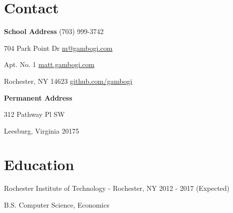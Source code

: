 \documentclass[letter,margin,line]{resume}
\newcommand{\rdate}[1]{\hfill {\small #1}}
\begin{document}
    \begin{resume}
        \section{\mysidestyle Contact} \vspace{2mm}
        \begin{asparablank}
        \item
        \item {\bf School Address}  \hfill (703) 999-3742
        \item 704 Park Point Dr     \hfill \href{mailto:m@gambogi.com}{m@gambogi.com}
        \item Apt. No. 1            \hfill \href{http://matt.gambogi.com}{matt.gambogi.com}
        \item Rochester, NY 14623   \hfill \href{https://github.com/gambogi}{github.com/gambogi}
        \\
        \item {\bf Permanent Address}
        \item 312 Pathway Pl SW
        \item Leesburg, Virginia 20175
        \end{asparablank}

        \section{\mysidestyle Education}
        \begin{compactdesc}
        \item[Rochester Institute of Technology] - Rochester, NY
            \rdate{2012 - 2017 (Expected)}
        \item B.S. Computer Science, Economics
        \end{compactdesc}


\end{resume}
\end{document}
